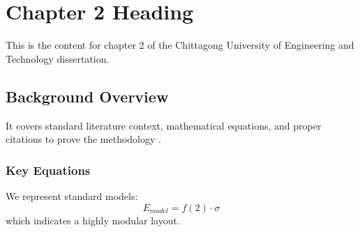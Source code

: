 \chapter{Chapter 2 Heading}
\label{ch:chapter2}
This is the content for chapter 2 of the Chittagong University of Engineering and Technology dissertation.

\section{Background Overview}
It covers standard literature context, mathematical equations, and proper citations to prove the methodology \cite{texbook}.

\subsection{Key Equations}
We represent standard models:
\begin{equation}
    E_{model} = f(2) \cdot \sigma
\end{equation}
which indicates a highly modular layout.

